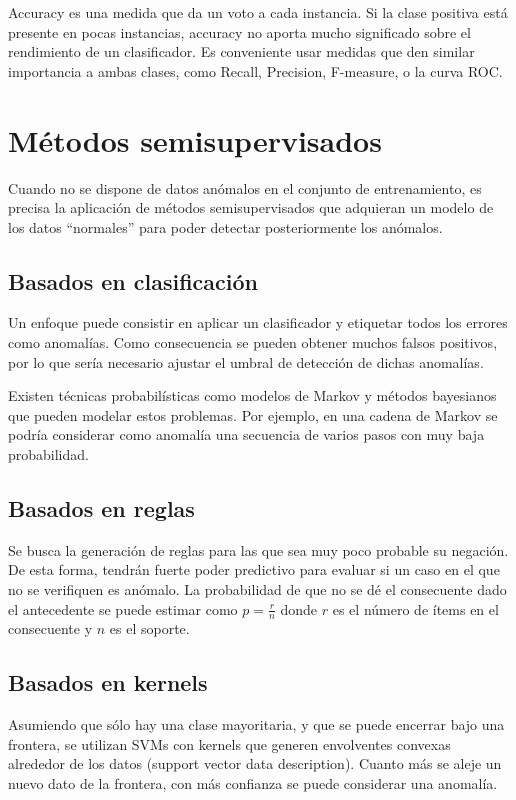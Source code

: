 \documentclass[a4paper,11pt,spanish]{report}
\let\stdsection\section
\let\stdsub\subsection
\let\stdsubsub\subsubsection
\renewcommand{\chapter}{\stdsection}
\renewcommand{\section}{\stdsub}
\renewcommand{\subsection}{\stdsubsub}
\begin{document}
Accuracy es una medida que da un voto a cada instancia. Si la clase positiva está presente en pocas instancias, accuracy no aporta mucho significado sobre el rendimiento de un clasificador. Es conveniente usar medidas que den similar importancia a ambas clases, como Recall, Precision, F-measure, o la curva ROC.

\chapter{Métodos semisupervisados}
\label{sec-2-3}

Cuando no se dispone de datos anómalos en el conjunto de entrenamiento, es precisa la aplicación de métodos semisupervisados que adquieran un modelo de los datos ``normales'' para poder detectar posteriormente los anómalos.

\section{Basados en clasificación}
\label{sec-2-3-1}

Un enfoque puede consistir en aplicar un clasificador y etiquetar todos los errores como anomalías. Como consecuencia se pueden obtener muchos falsos positivos, por lo que sería necesario ajustar el umbral de detección de dichas anomalías.

Existen técnicas probabilísticas como modelos de Markov y métodos bayesianos que pueden modelar estos problemas. Por ejemplo, en una cadena de Markov se podría considerar como anomalía una secuencia de varios pasos con muy baja probabilidad. 

\section{Basados en reglas}
\label{sec-2-3-2}

Se busca la generación de reglas para las que sea muy poco probable su negación. De esta forma, tendrán fuerte poder predictivo para evaluar si un caso en el que no se verifiquen es anómalo. La probabilidad de que no se dé el consecuente dado el antecedente se puede estimar como $p=\frac r n$ donde $r$ es el número de ítems en el consecuente y $n$ es el soporte.

\section{Basados en kernels}
\label{sec-2-3-3}

Asumiendo que sólo hay una clase mayoritaria, y que se puede encerrar bajo una frontera, se utilizan SVMs con kernels que generen envolventes convexas alrededor de los datos (support vector data description). Cuanto más se aleje un nuevo dato de la frontera, con más confianza se puede considerar una anomalía.
\end{document}
